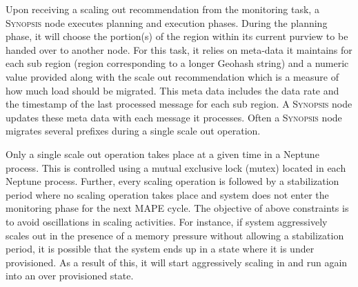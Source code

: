 Upon receiving a scaling out recommendation from the monitoring task, a \textsc{Synopsis} node executes planning and execution phases.
During the planning phase, it will choose the portion(s) of the region within its current purview to be handed over to another node.
For this task, it relies on meta-data it maintains for each sub region (region corresponding to a longer Geohash string) and a numeric value provided along with the scale out recommendation which is a measure of how much load should be migrated.
This meta data includes the data rate and the timestamp of the last processed message for each sub region.
A \textsc{Synopsis} node updates these meta data with each message it processes.
Often a \textsc{Synopsis} node migrates several prefixes during a single scale out operation.

Only a single scale out operation takes place at a given time in a Neptune process.
This is controlled using a mutual exclusive lock (mutex) located in each Neptune process.
Further, every scaling operation is followed by a stabilization period where no scaling operation takes place and system does not enter the monitoring phase for the next MAPE cycle.
The objective of above constraints is to avoid oscillations in scaling activities.
For instance, if system aggressively scales out in the presence of a memory pressure without allowing a stabilization period, it is possible that the system ends up in a state where it is under provisioned. As a result of this, it will start aggressively scaling in and run again into an over provisioned state.

